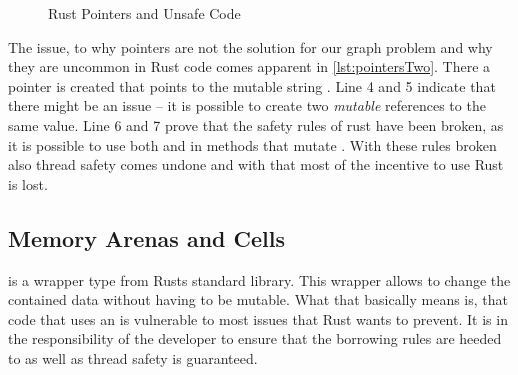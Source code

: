 \documentclass[thesis]{subfiles}
\begin{document}
    \newsavebox{\pointersOne}
    \begin{lrbox}{\pointersOne}%
      \begin{minipage}{.44\linewidth}
        
      \end{minipage}
    \end{lrbox}

    \newsavebox{\pointersTwo}
    \begin{lrbox}{\pointersTwo}
      \begin{minipage}{.49\linewidth}
        
      \end{minipage}
    \end{lrbox}

    \begin{figure}[ht]
      \captionsetup{type=lstlisting}
       \hfill%
      \caption{Rust Pointers and Unsafe Code}\label{lst:pointers}
    \end{figure}

    The issue, to why pointers are not the solution for our graph problem and why they are uncommon in Rust code comes apparent in \autoref{lst:pointersTwo}.
    There a pointer  is created that points to the mutable string .
    Line 4 and 5 indicate that there might be an issue -- it is possible to create two \emph{mutable} references to the same value.
    Line 6 and 7 prove that the safety rules of rust have been broken, as it is possible to use both  and  in methods that mutate .
    With these rules broken also thread safety comes undone and with that most of the incentive to use Rust is lost.

  \subsection{Memory Arenas and Cells}\label{sec:cell}
     is a wrapper type from Rusts standard library.
    This wrapper allows to change the contained data without having to be mutable.
    What that basically means is, that code that uses an  is vulnerable to most issues that Rust wants to prevent.
    It is in the responsibility of the developer to ensure that the borrowing rules are heeded to as well as thread safety is guaranteed.\autocite{rust-doc}
\end{document}
